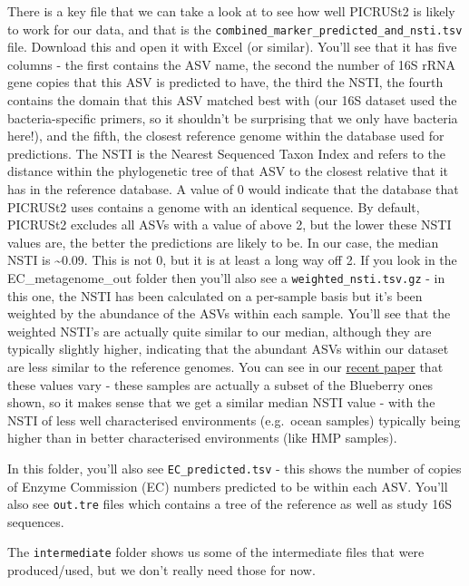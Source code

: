 \documentclass[
]{book}
\begin{document}
There is a key file that we can take a look at to see how well PICRUSt2 is likely to work for our data, and that is the \texttt{combined\_marker\_predicted\_and\_nsti.tsv} file. Download this and open it with Excel (or similar). You'll see that it has five columns - the first contains the ASV name, the second the number of 16S rRNA gene copies that this ASV is predicted to have, the third the NSTI, the fourth contains the domain that this ASV matched best with (our 16S dataset used the bacteria-specific primers, so it shouldn't be surprising that we only have bacteria here!), and the fifth, the closest reference genome within the database used for predictions. The NSTI is the Nearest Sequenced Taxon Index and refers to the distance within the phylogenetic tree of that ASV to the closest relative that it has in the reference database. A value of 0 would indicate that the database that PICRUSt2 uses contains a genome with an identical sequence. By default, PICRUSt2 excludes all ASVs with a value of above 2, but the lower these NSTI values are, the better the predictions are likely to be. In our case, the median NSTI is \textasciitilde0.09. This is not 0, but it is at least a long way off 2. If you look in the EC\_metagenome\_out folder then you'll also see a \texttt{weighted\_nsti.tsv.gz} - in this one, the NSTI has been calculated on a per-sample basis but it's been weighted by the abundance of the ASVs within each sample. You'll see that the weighted NSTI's are actually quite similar to our median, although they are typically slightly higher, indicating that the abundant ASVs within our dataset are less similar to the reference genomes. You can see in our \href{https://academic.oup.com/bioinformatics/article/41/5/btaf269/8121151}{recent paper} that these values vary - these samples are actually a subset of the Blueberry ones shown, so it makes sense that we get a similar median NSTI value - with the NSTI of less well characterised environments (e.g.~ocean samples) typically being higher than in better characterised environments (like HMP samples).

In this folder, you'll also see \texttt{EC\_predicted.tsv} - this shows the number of copies of Enzyme Commission (EC) numbers predicted to be within each ASV. You'll also see \texttt{out.tre} files which contains a tree of the reference as well as study 16S sequences.

The \texttt{intermediate} folder shows us some of the intermediate files that were produced/used, but we don't really need those for now.
\end{document}
